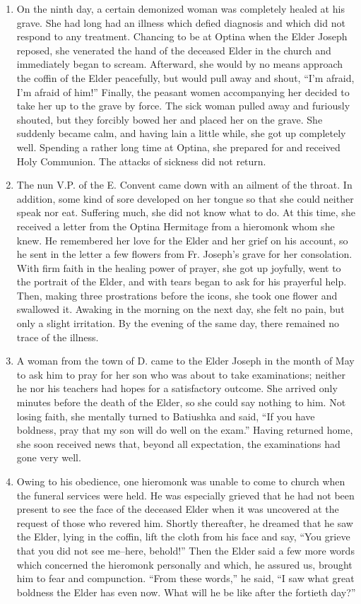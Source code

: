 \begin{enumerate}
\item On the ninth day, a certain demonized woman was completely healed at his grave. She had long had an illness which defied diagnosis and which did not respond to any treatment. Chancing to be at Optina when the Elder Joseph reposed, she venerated the hand of the deceased Elder in the church and immediately began to scream. Afterward, she would by no means approach the coffin of the Elder peacefully, but would pull away and shout, ``I'm afraid, I'm afraid of him!'' Finally, the peasant women accompanying her decided to take her up to the grave by force. The sick woman pulled away and furiously shouted, but they forcibly bowed her and placed her on the grave. She suddenly became calm, and having lain a little while, she got up completely well. Spending a rather long time at Optina, she prepared for and received Holy Communion. The attacks of sickness did not return.

\item The nun V.P. of the E. Convent came down with an ailment of the throat. In addition, some kind of sore developed on her tongue so that she could neither speak nor eat. Suffering much, she did not know what to do. At this time, she received a letter from the Optina Hermitage from a hieromonk whom she knew. He remembered her love for the Elder and her grief on his account, so he sent in the letter a few flowers from Fr. Joseph's grave for her consolation. With firm faith in the healing power of prayer, she got up joyfully, went to the portrait of the Elder, and with tears began to ask for his prayerful help. Then, making three prostrations before the icons, she took one flower and swallowed it. Awaking in the morning on the next day, she felt no pain, but only a slight irritation. By the evening of the same day, there remained no trace of the illness.

\item A woman from the town of D. came to the Elder Joseph in the month of May to ask him to pray for her son who was about to take examinations; neither he nor his teachers had hopes for a satisfactory outcome. She arrived only minutes before the death of the Elder, so she could say nothing to him. Not losing faith, she mentally turned to Batiushka and said, ``If you have boldness, pray that my son will do well on the exam.'' Having returned home, she soon received news that, beyond all expectation, the examinations had gone very well.

\item Owing to his obedience, one hieromonk was unable to come to church when the funeral services were held. He was especially grieved that he had not been present to see the face of the deceased Elder when it was uncovered at the request of those who revered him. Shortly thereafter, he dreamed that he saw the Elder, lying in the coffin, lift the cloth from his face and say, ``You grieve that you did not see me--here, behold!'' Then the Elder said a few more words which concerned the hieromonk personally and which, he assured us, brought him to fear and compunction. ``From these words,'' he said, ``I saw what great boldness the Elder has even now. What will he be like after the fortieth day?''


\end{enumerate}
